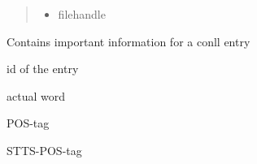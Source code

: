 \documentclass[letterpaper,10pt,english]{sphinxmanual}
\begin{document}
\begin{fulllineitems}
\begin{fulllineitems}
\begin{quote}
\begin{description}
\begin{itemize}
\item {} 
 \textendash{} filehandle

\end{itemize}

\end{description}\end{quote}

\end{fulllineitems}


\end{fulllineitems}

\label{\detokenize{api:module-conll_parser}}

\begin{fulllineitems}
\label{\detokenize{api:conll_parser.Entry}}
Contains important information for a conll entry

\begin{fulllineitems}
\label{\detokenize{api:conll_parser.Entry.id_}}
id of the entry

\end{fulllineitems}


\begin{fulllineitems}
\label{\detokenize{api:conll_parser.Entry.form}}
actual word

\end{fulllineitems}


\begin{fulllineitems}
\label{\detokenize{api:conll_parser.Entry.pos}}
POS-tag

\end{fulllineitems}


\begin{fulllineitems}
\label{\detokenize{api:conll_parser.Entry.xpos}}
STTS-POS-tag


\end{fulllineitems}
\end{fulllineitems}
\end{document}
